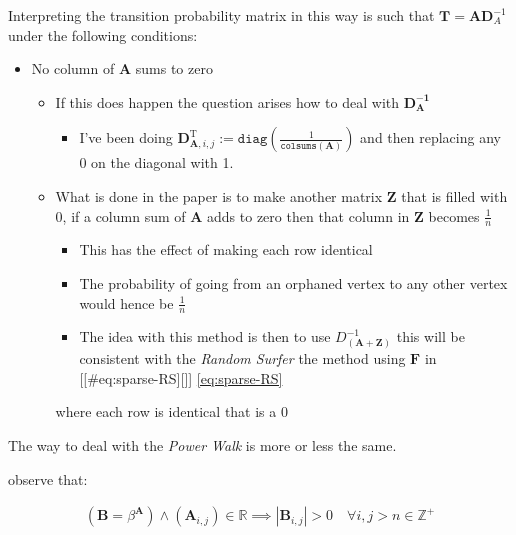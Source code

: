 \documentclass[11pt]{article}
\begin{document}
Interpreting the transition probability matrix in this way is such that
\(\mathbf{T}= \mathbf{A}\mathbf{D}^{- 1}_A\) under the following
conditions:


\begin{itemize}
\item No column of \(\mathbf{A}\) sums to zero

\begin{itemize}
\item If this does happen the question arises how to deal with
\(\mathbf{D_\mathbf{A}^{- 1}}\)

\begin{itemize}
\item I've been doing \(\mathbf{D}^{\mathrm{T}}_{\mathbf{A}, i, j} := \mathtt{diag} \left( {\frac{1}{\mathtt{colsums}\left( \mathbf{A} \right)}} \right)\)
and then replacing any \(0\) on the diagonal with 1.
\end{itemize}

\item What is done in the paper is to make another matrix \(\mathbf{Z}\)
that is filled with 0, if a column sum of \(\mathbf{A}\) adds to zero
then that column in \(\mathbf{Z}\) becomes \(\frac{1}{n}\)

\begin{itemize}
\item This has the effect of making each row identical

\item The probability of going from an orphaned vertex to any other
vertex would hence be \(\frac{1}{n}\)

\item The idea with this method is then to use
\(D_\mathbf{\left( A+Z \right)}^{- 1}\) this will be consistent with
the \emph{Random Surfer} the method using \(\mathbf{F}\) in
[[\#eq:sparse-RS][]] \eqref{eq:sparse-RS}
\end{itemize}

where each row is identical that is a 0
\end{itemize}
\end{itemize}

The way to deal with the \emph{Power Walk} is more or less the same.

observe that:

\begin{align}
   \left( \mathbf{B} = \beta^{\mathbf{A}} \right)\wedge \left( \mathbf{A}_{i, j}\right)\in \mathbb{R}  \implies  \left\lvert \mathbf{B}_{i, j} \right\rvert > 0 \quad \forall i,j>n\in \mathbb{Z}^+ \label{eq:b-is-pos}
\end{align}
\end{document}
